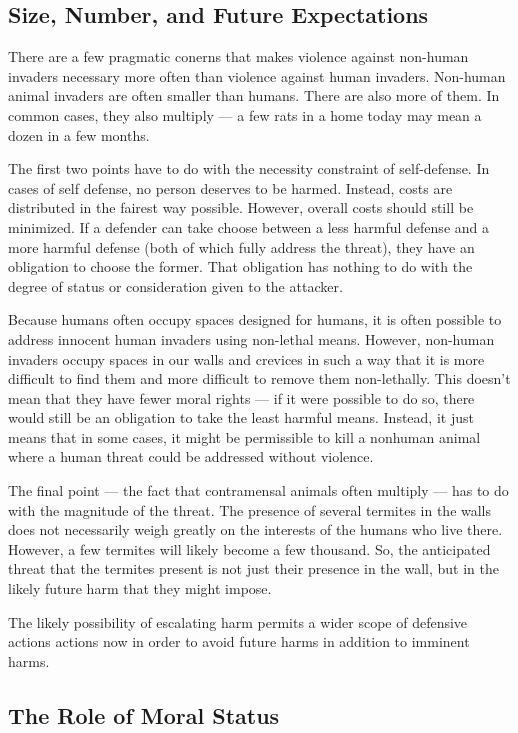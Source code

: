 	\subsection{Size, Number, and Future Expectations}

	There are a few pragmatic conerns that makes violence against non-human
	invaders necessary more often than violence against human invaders.
	Non-human animal invaders are often smaller than humans. There are also more
	of them. In common cases, they also multiply --- a few rats in a home today
	may mean a dozen in a few months.

	The first two points have to do with the necessity constraint of
	self-defense.  In cases of self defense, no person deserves to be harmed.
	Instead, costs are distributed in the fairest way possible. However,
	overall costs should still be minimized. If a defender can take choose
	between a less harmful defense and a more harmful defense (both of which
	fully address the threat), they have an obligation to choose the former.
	That obligation has nothing to do with the degree of status or
	consideration given to the attacker.

	Because humans often occupy spaces designed for humans, it is often
	possible to address innocent human invaders using non-lethal means.
	However, non-human invaders occupy spaces in our walls and crevices in such
	a way that it is more difficult to find them and more difficult to remove
	them non-lethally. This doesn’t mean that they have fewer moral rights ---
	if it were possible to do so, there would still be an obligation to take
	the least harmful means. Instead, it just means that in some cases, it
	might be permissible to kill a nonhuman animal where a human threat could
	be addressed without violence.

	The final point --- the fact that contramensal animals often multiply ---
	has to do with the magnitude of the threat. The presence of several
	termites in the walls does not necessarily weigh greatly on the interests
	of the humans who live there. However, a few termites will likely become a
	few thousand. So, the anticipated threat that the termites present is not
	just their presence in the wall, but in the likely future harm that they
	might impose.

	The likely possibility of escalating harm permits a wider scope of
	defensive actions actions now in order to avoid future harms in addition to
	imminent harms.

	\subsection{The Role of Moral Status}

